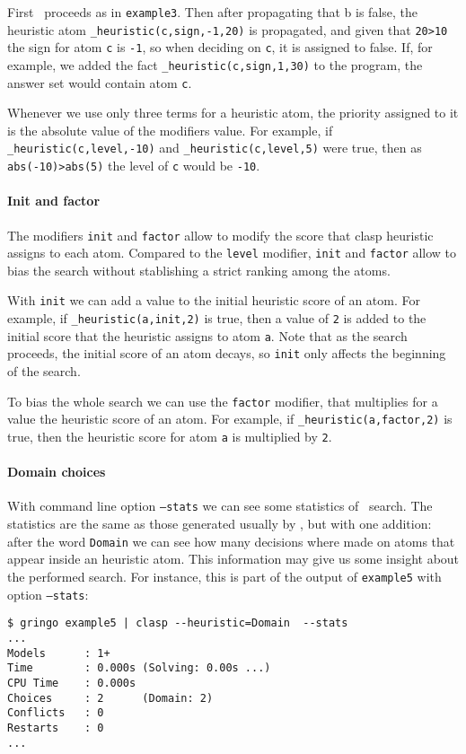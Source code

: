 First \clasp\ proceeds as in \texttt{example3}.
Then after propagating that b is false,  the heuristic atom \texttt{\_heuristic(c,sign,-1,20)} is propagated,
and given that \texttt{20>10} the sign for atom \texttt{c} is \texttt{-1}, so when deciding on \texttt{c}, it is assigned to false.
If, for example, we added the fact \texttt{\_heuristic(c,sign,1,30)} to the program, the answer set would contain atom \texttt{c}.

Whenever we use only three terms for a heuristic atom, the priority assigned to it is the absolute value of the modifiers value.
For example, if \texttt{\_heuristic(c,level,-10)} and \texttt{\_heuristic(c,level,5)} were true,
then as \texttt{abs(-10)>abs(5)} the level of \texttt{c} would be \texttt{-10}.

\paragraph{Init and factor}

The modifiers \texttt{init} and \texttt{factor} allow to modify the score that clasp heuristic assigns to each atom.
Compared to the \texttt{level} modifier, \texttt{init} and \texttt{factor} allow to bias the search without stablishing a strict ranking among the atoms.

With \texttt{init} we can add a value to the initial heuristic score of an atom.
For example, if \texttt{\_heuristic(a,init,2)} is true, then a value of \texttt{2} is added to
the initial score that the heuristic assigns to atom \texttt{a}.
Note that as the search proceeds, the initial score of an atom decays, so \texttt{init} only affects the beginning of the search.

To bias the whole search we can use the \texttt{factor} modifier,
that multiplies for a value the heuristic score of an atom.
For example, if \texttt{\_heuristic(a,factor,2)} is true, then the heuristic score for atom \texttt{a}  is multiplied by \texttt{2}.

\paragraph{Domain choices}

With command line option \texttt{--stats} we can see some statistics of \clasp\ search.
The statistics are the same as those generated usually by \clasp, but with one addition:
after the word \texttt{Domain} we can see how many decisions where made on atoms that appear  inside an heuristic atom.
This information may give us some insight about the performed search.
For instance, this is part of the output of \texttt{example5} with option \texttt{--stats}:
\begin{lstlisting}[numbers=none]
$ gringo example5 | clasp --heuristic=Domain  --stats
...
Models      : 1+
Time        : 0.000s (Solving: 0.00s ...)
CPU Time    : 0.000s
Choices     : 2      (Domain: 2)
Conflicts   : 0
Restarts    : 0
...
\end{lstlisting}

